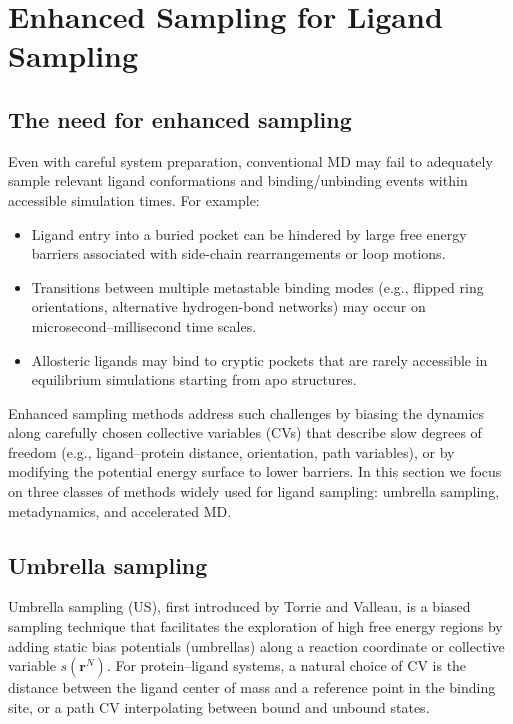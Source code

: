 \documentclass[12pt,a4paper]{article}
\begin{document}
\section{Enhanced Sampling for Ligand Sampling}

\subsection{The need for enhanced sampling}

Even with careful system preparation, conventional MD may fail to adequately sample relevant ligand conformations and binding/unbinding events within accessible simulation times. For example:

\begin{itemize}
\item Ligand entry into a buried pocket can be hindered by large free energy barriers associated with side-chain rearrangements or loop motions.
\item Transitions between multiple metastable binding modes (e.g., flipped ring orientations, alternative hydrogen-bond networks) may occur on microsecond--millisecond time scales.
\item Allosteric ligands may bind to cryptic pockets that are rarely accessible in equilibrium simulations starting from apo structures.
\end{itemize}

Enhanced sampling methods address such challenges by biasing the dynamics along carefully chosen collective variables (CVs) that describe slow degrees of freedom (e.g., ligand--protein distance, orientation, path variables), or by modifying the potential energy surface to lower barriers.\cite{LaioParrinello2002,Barducci2008,Hamelberg2004} In this section we focus on three classes of methods widely used for ligand sampling: umbrella sampling, metadynamics, and accelerated MD.

\subsection{Umbrella sampling}

Umbrella sampling (US), first introduced by Torrie and Valleau, is a biased sampling technique that facilitates the exploration of high free energy regions by adding static bias potentials (umbrellas) along a reaction coordinate or collective variable \(s(\mathbf{r}^N)\).\cite{TorrieValleau1977} For protein--ligand systems, a natural choice of CV is the distance between the ligand center of mass and a reference point in the binding site, or a path CV interpolating between bound and unbound states.
\end{document}
